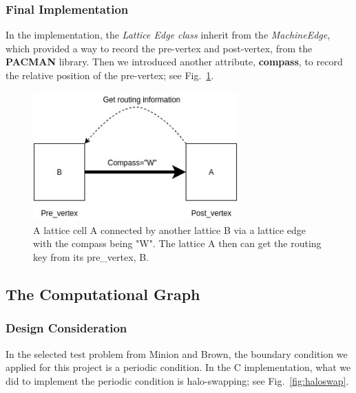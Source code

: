 \subsubsection{Final Implementation}
In the implementation, the \textit{Lattice Edge class} inherit from the \textit{MachineEdge}, which provided a way to record the pre-vertex and post-vertex, from the \textbf{PACMAN} library. Then we introduced another attribute, \textbf{compass}, to record the relative position of the pre-vertex; see Fig.~\ref{fig:edge}.
\begin{figure}[tb]
   \centering
       \includegraphics[width=0.7\textwidth]{figures/edge.jpg}
       \caption{A lattice cell A connected by another lattice B via a lattice edge with the compass being "W". The lattice A then can get the routing key from its pre\_vertex, B.}
       \label{fig:edge}
\end{figure}

\subsection{The Computational Graph} \label{sec:tcg} 
\subsubsection{Design Consideration}
In the selected test problem from Minion and Brown\cite{minion1997performance}, the boundary condition we applied for this project is a periodic condition. In the C implementation, what we did to implement the periodic condition is halo-swapping; see Fig.~\ref{fig:haloswap}. 


